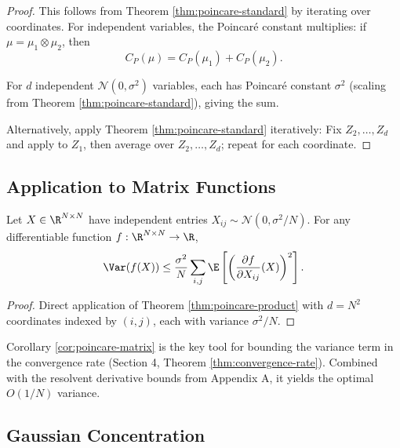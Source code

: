 \begin{proof}
This follows from Theorem \ref{thm:poincare-standard} by iterating over coordinates. For independent variables, the Poincaré constant multiplies: if $\mu = \mu_1 \otimes \mu_2$, then
\[
C_P(\mu) = C_P(\mu_1) + C_P(\mu_2).
\]

For $d$ independent $\mathcal{N}(0, \sigma^2)$ variables, each has Poincaré constant $\sigma^2$ (scaling from Theorem \ref{thm:poincare-standard}), giving the sum.

Alternatively, apply Theorem \ref{thm:poincare-standard} iteratively: Fix $Z_2, \ldots, Z_d$ and apply to $Z_1$, then average over $Z_2, \ldots, Z_d$; repeat for each coordinate.
\end{proof}

\subsection{Application to Matrix Functions}

\begin{corollary}\label{cor:poincare-matrix}
Let $X \in \R^{N \times N}$ have independent entries $X_{ij} \sim \mathcal{N}(0, \sigma^2/N)$. For any differentiable function $f: \R^{N \times N} \to \R$,
\begin{equation}\label{eq:poincare-matrix}
\Var(f(X)) \leq \frac{\sigma^2}{N} \sum_{i,j} \E\left[\left(\frac{\partial f}{\partial X_{ij}}(X)\right)^2\right].
\end{equation}
\end{corollary}

\begin{proof}
Direct application of Theorem \ref{thm:poincare-product} with $d = N^2$ coordinates indexed by $(i,j)$, each with variance $\sigma^2/N$.
\end{proof}

\begin{remark}
Corollary \ref{cor:poincare-matrix} is the key tool for bounding the variance term in the convergence rate (Section 4, Theorem \ref{thm:convergence-rate}). Combined with the resolvent derivative bounds from Appendix A, it yields the optimal $O(1/N)$ variance.
\end{remark}

\subsection{Gaussian Concentration}


